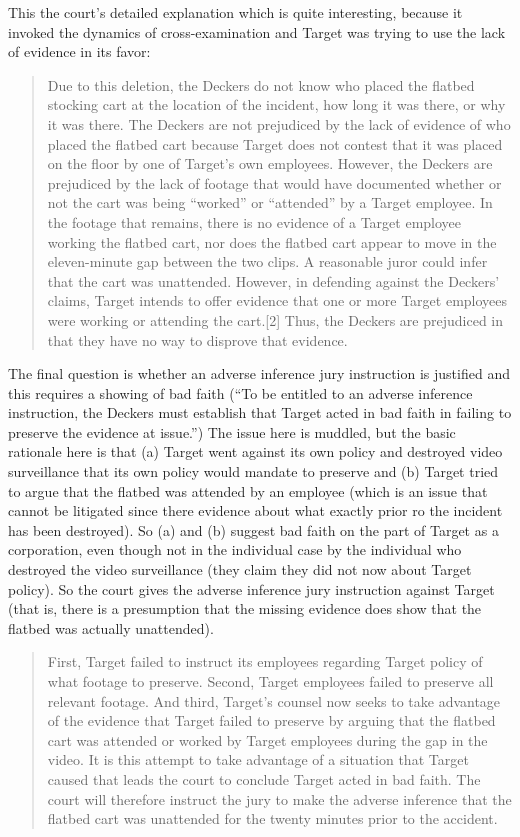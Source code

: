 \documentclass[
  10pt,
  dvipsnames,enabledeprecatedfontcommands]{scrartcl}
\begin{document}
This the court's detailed explanation which is quite interesting,
because it invoked the dynamics of cross-examination and Target was
trying to use the lack of evidence in its favor:

\begin{quote}
Due to this deletion, the Deckers do not know who placed the flatbed stocking cart at the location of the
incident, how long it was there, or why it was there. The Deckers are not prejudiced by the lack of evidence of who placed the flatbed cart because Target does not contest that it was placed on the floor by one of Target’s own employees. However, the Deckers are prejudiced by the lack of footage that would have documented  whether or not the cart was being “worked” or “attended” by a Target employee. In the footage that remains, there is no evidence of a Target employee working the flatbed cart, nor does the flatbed cart appear to move in the eleven-minute gap between the two clips. A reasonable juror could infer that the cart was unattended. However, in defending against the Deckers’ claims, Target intends to offer evidence that one or more Target employees were working or attending the cart.[2] Thus, the Deckers are prejudiced in that they have no way to disprove that evidence.
\end{quote}

The final question is whether an adverse inference jury instruction is
justified and this requires a showing of bad faith (``To be entitled to
an adverse inference instruction, the Deckers must establish that Target
acted in bad faith in failing to preserve the evidence at issue.'') The
issue here is muddled, but the basic rationale here is that (a) Target
went against its own policy and destroyed video surveillance that its
own policy would mandate to preserve and (b) Target tried to argue that
the flatbed was attended by an employee (which is an issue that cannot
be litigated since there evidence about what exactly prior ro the
incident has been destroyed). So (a) and (b) suggest bad faith on the
part of Target as a corporation, even though not in the individual case
by the individual who destroyed the video surveillance (they claim they
did not now about Target policy). So the court gives the adverse
inference jury instruction against Target (that is, there is a
presumption that the missing evidence does show that the flatbed was
actually unattended).

\begin{quote}
First, Target failed to instruct its employees regarding Target policy of what footage to preserve. Second, Target employees failed to preserve all relevant footage. And third, Target’s counsel now seeks to take advantage of the evidence that Target failed to preserve by arguing that the flatbed cart was attended or worked by Target employees during the gap in the video. It is this attempt to take advantage of a situation that Target caused that leads the court to conclude Target acted in bad faith. The court will therefore instruct the jury to make the adverse inference that the flatbed cart was unattended for the twenty minutes prior to the accident.
\end{quote}
\end{document}
